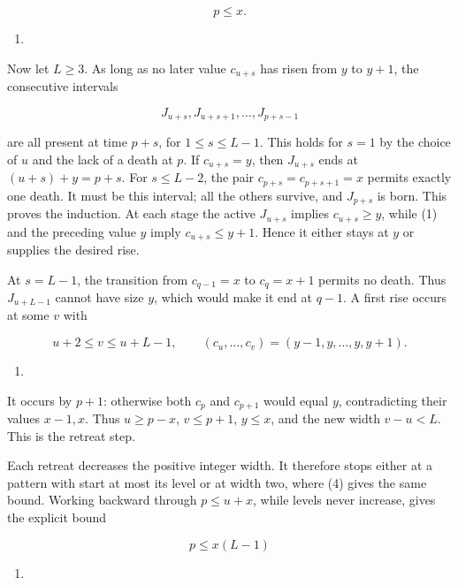 \documentclass[11pt,a4paper]{article}
\providecommand{\tightlist}{\setlength{\itemsep}{0pt}\setlength{\parskip}{0pt}}
\begin{document}
\[
p\le x.
\]

\begin{enumerate}
\def\labelenumi{(\arabic{enumi})}
\setcounter{enumi}{3}
\tightlist
\item
\end{enumerate}

Now let \(L\ge3\). As long as no later value \(c_{u+s}\) has risen from \(y\) to \(y+1\), the consecutive intervals

\[
J_{u+s},J_{u+s+1},\ldots,J_{p+s-1}
\]

are all present at time \(p+s\), for \(1\le s\le L-1\). This holds for \(s=1\) by the choice of \(u\) and the lack of a death at \(p\). If \(c_{u+s}=y\), then \(J_{u+s}\) ends at \((u+s)+y=p+s\). For \(s\le L-2\), the pair \(c_{p+s}=c_{p+s+1}=x\) permits exactly one death. It must be this interval; all the others survive, and \(J_{p+s}\) is born. This proves the induction. At each stage the active \(J_{u+s}\) implies \(c_{u+s}\ge y\), while (1) and the preceding value \(y\) imply \(c_{u+s}\le y+1\). Hence it either stays at \(y\) or supplies the desired rise.

At \(s=L-1\), the transition from \(c_{q-1}=x\) to \(c_q=x+1\) permits no death. Thus \(J_{u+L-1}\) cannot have size \(y\), which would make it end at \(q-1\). A first rise occurs at some \(v\) with

\[
u+2\le v\le u+L-1,
\qquad(c_u,\ldots,c_v)=(y-1,y,\ldots,y,y+1).
\]

\begin{enumerate}
\def\labelenumi{(\arabic{enumi})}
\setcounter{enumi}{4}
\tightlist
\item
\end{enumerate}

It occurs by \(p+1\): otherwise both \(c_p\) and \(c_{p+1}\) would equal \(y\), contradicting their values \(x-1,x\). Thus \(u\ge p-x\), \(v\le p+1\), \(y\le x\), and the new width \(v-u<L\). This is the retreat step.

Each retreat decreases the positive integer width. It therefore stops either at a pattern with start at most its level or at width two, where (4) gives the same bound. Working backward through \(p\le u+x\), while levels never increase, gives the explicit bound

\[
\boxed{p\le x(L-1)}
\]

\begin{enumerate}
\def\labelenumi{(\arabic{enumi})}
\setcounter{enumi}{5}
\tightlist
\item
\end{enumerate}
\end{document}
